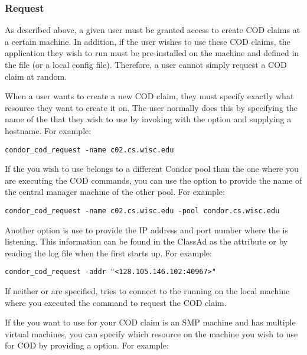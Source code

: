 \subsubsection{\label{sec:cod-claim-request}Request}

As described above, a given user must be granted access to create COD
claims at a certain machine.
In addition, if the user wishes to use these COD claims, the
application they wish to run must be pre-installed on the machine and
defined in the  file (or a local config file). 
Therefore, a user cannot simply request a COD claim at random.

When a user wants to create a new COD claim, they must specify exactly
what resource they want to create it on.
The user normally does this by specifying the name of the
 that they wish to use by invoking
 with the  option and supplying a
hostname.  For example:
\begin{verbatim}
condor_cod_request -name c02.cs.wisc.edu
\end{verbatim}
If the  you wish to use belongs to a different Condor
pool than the one where you are executing the COD commands, you can
use the  option to provide the name of the central manager
machine of the other pool.  For example:
\begin{verbatim}
condor_cod_request -name c02.cs.wisc.edu -pool condor.cs.wisc.edu
\end{verbatim}

Another option is use  to provide the IP address and port
number where the  is listening.
This information can be found in the  ClassAd as the
attribute  or by reading the log file when the
 first starts up.
For example:
\begin{verbatim}
condor_cod_request -addr "<128.105.146.102:40967>"
\end{verbatim}
  
If neither  or  are specified,
 tries to connect to the  running
on the local machine where you executed the command to request the COD
claim.

If the  you want to use for your COD claim is an SMP
machine and has multiple virtual machines, you can specify which
resource on the machine you wish to use for COD by providing a
 option.  For example:

